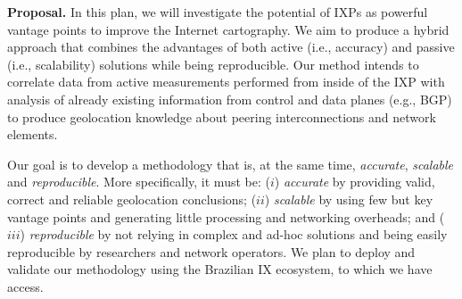 	\textbf{Proposal.} In this plan, we will investigate the potential of IXPs as powerful vantage points to improve the Internet cartography. We aim to produce a hybrid approach that combines the advantages of both active (i.e., accuracy) and passive (i.e., scalability) solutions while being reproducible. Our method intends to correlate data from active measurements performed from inside of the IXP with analysis of already existing information from control and data planes (e.g., BGP) to produce geolocation knowledge about peering interconnections and network elements. 

	Our goal is to develop a methodology that is, at the same time, \emph{accurate}, \emph{scalable} and \emph{reproducible}. More specifically, it must be: ($i$) \emph{accurate} by providing valid, correct and reliable geolocation conclusions; ($ii$) \emph{scalable} by using few but key vantage points and generating little processing and networking overheads; and ($iii$) \emph{reproducible} by not relying in complex and ad-hoc solutions and being easily reproducible by researchers and network operators. We plan to deploy and validate our methodology using the Brazilian IX ecosystem, to which we have access.



